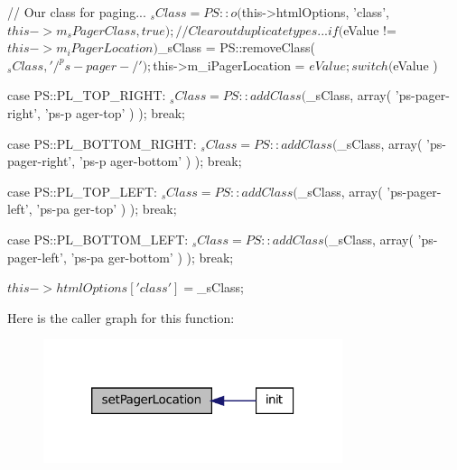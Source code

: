 \begin{DoxyCode}
    {
        //  Our class for paging...
        $_sClass = PS::o( $this->htmlOptions, 'class', $this->m_sPagerClass, true
       );

        //  Clear out duplicate types...
        if ( $eValue != $this->m_iPagerLocation )
            $_sClass = PS::removeClass( $_sClass, '/^ps-pager-/' );
            
        $this->m_iPagerLocation = $eValue;
        
        switch ( $eValue )
        {
            case PS::PL_TOP_RIGHT:
                $_sClass = PS::addClass( $_sClass, array( 'ps-pager-right', 'ps-p
      ager-top' )  );
                break;
                
            case PS::PL_BOTTOM_RIGHT:
                $_sClass = PS::addClass( $_sClass, array( 'ps-pager-right', 'ps-p
      ager-bottom' )  );
                break;
                
            case PS::PL_TOP_LEFT:
                $_sClass = PS::addClass( $_sClass, array( 'ps-pager-left', 'ps-pa
      ger-top' )  );
                break;
                
            case PS::PL_BOTTOM_LEFT:
                $_sClass = PS::addClass( $_sClass, array( 'ps-pager-left', 'ps-pa
      ger-bottom' )  );
                break;
        }
        
        $this->htmlOptions['class'] = $_sClass;
    }
\end{DoxyCode}




Here is the caller graph for this function:\nopagebreak
\begin{figure}[H]
\begin{center}
\leavevmode
\includegraphics[width=248pt]{classCPSLinkPager_a8608d6f2314b2052b0825fc7e3e273c6_icgraph}
\end{center}
\end{figure}




